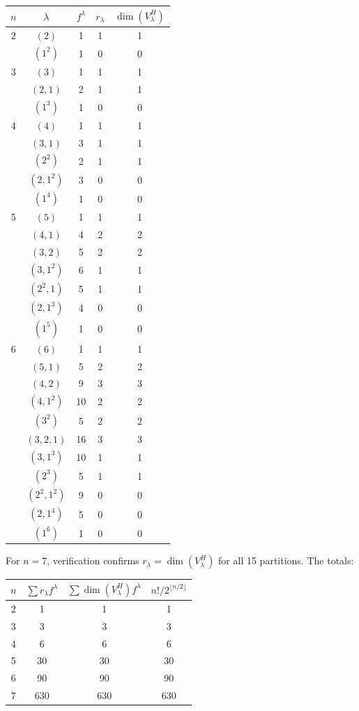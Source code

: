 \documentclass[11pt]{article}
\theoremstyle{definition}
\theoremstyle{remark}
\begin{document}
\begin{center}
\small
\begin{tabular}{c|c|c|c|c}
\toprule
$n$ & $\lambda$ & $f^\lambda$ & $r_\lambda$ & $\dim(V_\lambda^H)$ \\
\midrule
2 & $(2)$ & 1 & 1 & 1 \\
  & $(1^2)$ & 1 & 0 & 0 \\
\midrule
3 & $(3)$ & 1 & 1 & 1 \\
  & $(2,1)$ & 2 & 1 & 1 \\
  & $(1^3)$ & 1 & 0 & 0 \\
\midrule
4 & $(4)$ & 1 & 1 & 1 \\
  & $(3,1)$ & 3 & 1 & 1 \\
  & $(2^2)$ & 2 & 1 & 1 \\
  & $(2,1^2)$ & 3 & 0 & 0 \\
  & $(1^4)$ & 1 & 0 & 0 \\
\midrule
5 & $(5)$ & 1 & 1 & 1 \\
  & $(4,1)$ & 4 & 2 & 2 \\
  & $(3,2)$ & 5 & 2 & 2 \\
  & $(3,1^2)$ & 6 & 1 & 1 \\
  & $(2^2,1)$ & 5 & 1 & 1 \\
  & $(2,1^3)$ & 4 & 0 & 0 \\
  & $(1^5)$ & 1 & 0 & 0 \\
\midrule
6 & $(6)$ & 1 & 1 & 1 \\
  & $(5,1)$ & 5 & 2 & 2 \\
  & $(4,2)$ & 9 & 3 & 3 \\
  & $(4,1^2)$ & 10 & 2 & 2 \\
  & $(3^2)$ & 5 & 2 & 2 \\
  & $(3,2,1)$ & 16 & 3 & 3 \\
  & $(3,1^3)$ & 10 & 1 & 1 \\
  & $(2^3)$ & 5 & 1 & 1 \\
  & $(2^2,1^2)$ & 9 & 0 & 0 \\
  & $(2,1^4)$ & 5 & 0 & 0 \\
  & $(1^6)$ & 1 & 0 & 0 \\
\bottomrule
\end{tabular}
\end{center}

\noindent For $n = 7$, verification confirms $r_\lambda = \dim(V_\lambda^H)$
for all 15 partitions. The totals:

\begin{center}
\begin{tabular}{c|c|c|c}
\toprule
$n$ & $\sum r_\lambda f^\lambda$ & $\sum \dim(V_\lambda^H) f^\lambda$ & $n!/2^{\lfloor n/2\rfloor}$ \\
\midrule
2 & 1 & 1 & 1 \\
3 & 3 & 3 & 3 \\
4 & 6 & 6 & 6 \\
5 & 30 & 30 & 30 \\
6 & 90 & 90 & 90 \\
7 & 630 & 630 & 630 \\
\bottomrule
\end{tabular}
\end{center}
\end{document}
